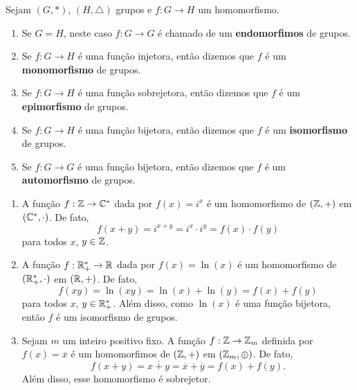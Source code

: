 \begin{observacao}
	Sejam $(G, *)$, $(H, \triangle)$ grupos e $f : G \to H$ um homomorfismo.
	\begin{enumerate}[label={\arabic*})]
		\item Se $G = H$, neste caso $f : G \to G$ \'e chamado de um \textbf{endomorfimos} de grupos.
		\item Se $f : G \to H$ \'e uma fun\c{c}\~ao injetora, ent\~ao dizemos que $f$ \'e um \textbf{monomorfismo} de grupos.
		\item Se $f : G \to H$ \'e uma fun\c{c}\~ao sobrejetora, ent\~ao dizemos que $f$ \'e um \textbf{epimorfismo} de grupos.
		\item Se $f : G \to H$ \'e uma fun\c{c}\~ao bijetora, ent\~ao dizemos que $f$ \'e um \textbf{isomorfismo} de grupos.
		\item Se $f : G \to G$ \'e uma fun\c{c}\~ao bijetora, ent\~ao dizemos que $f$ \'e um \textbf{automorfismo} de grupos.
	\end{enumerate}
\end{observacao}

\begin{exemplos}
	\begin{enumerate}[label={\arabic*})]
		\item A fun\c{c}\~ao $f : \mathbb{Z} \to \mathbb{C}^*$ dada por $f(x) = i^x$ \'e um homomorfismo de $(\mathbb{Z}, +)$ em $(\mathbb{C}^*, \cdot)$. De fato,
		\[
			f(x + y) = i^{x + y} = i^x\cdot i^y = f(x)\cdot f(y)
		\]
		para todos $x$, $y \in \mathbb{Z}$.

		\item A fun\c{c}\~ao $f : \mathbb{R}^*_+ \to \mathbb{R}$ dada por $f(x) = \ln(x)$ \'e um homomorfismo de $(\mathbb{R}^*_+, \cdot)$ em $(\mathbb{R}, +)$. De fato,
		\[
			f(xy) = \ln(xy) = \ln(x) + \ln(y) = f(x) + f(y)
		\]
		para todos $x$, $y \in \mathbb{R}^*_+$. Al\'em disso, como $\ln(x)$ \'e uma fun\c{c}\~ao bijetora, ent\~ao $f$ \'e um isomorfismo de grupos.

		\item Sejam $m$ um inteiro positivo fixo. A fun\c{c}\~ao $f: \mathbb{Z} \to \mathbb{Z}_m$ definida por $f(x) = \overline{x}$ \'e um homomorfimos de $(\mathbb{Z}, +)$ em $(\mathbb{Z}_m, \oplus)$. De fato,
		\[
			f(x + y) = \overline{x + y} = \overline{x} + \overline{y} = f(x) + f(y).
		\]
		Al\'em disso, esse homomorfismo \'e sobrejetor.
	\end{enumerate}
\end{exemplos}

